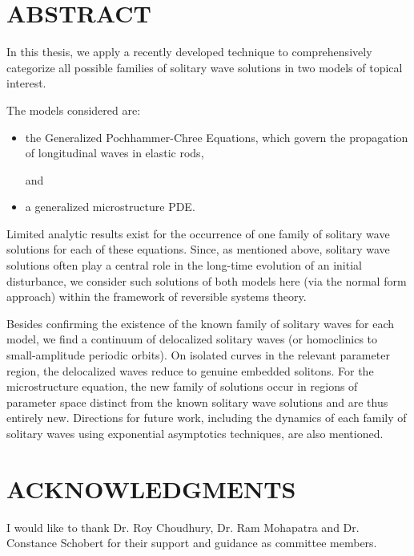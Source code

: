 \chapter*{ABSTRACT}

\indent 

In this thesis, we apply a recently developed technique to
comprehensively categorize all possible families of solitary wave
solutions in two models of topical interest.

The models considered are:
\begin{itemize}
\item the Generalized Pochhammer-Chree Equations, which  govern the propagation of longitudinal waves in elastic rods,

and

\item a generalized microstructure PDE.
\end{itemize}

Limited analytic results exist for the occurrence of one family of  solitary
wave solutions for each of these equations. Since, as mentioned above, solitary
wave solutions often play a central role in the long-time evolution of an
initial disturbance, we consider such solutions of both models here (via the
normal form approach) within the framework of reversible systems theory.

Besides confirming the existence of the known family of solitary waves for each
model, we find a continuum of delocalized solitary waves (or homoclinics to
small-amplitude periodic orbits).  On isolated curves in the relevant parameter
region, the delocalized waves reduce to genuine embedded solitons.  For the
microstructure equation, the new family of solutions occur in regions of
parameter space distinct from the known solitary wave solutions and are thus
entirely new. Directions for future work, including the dynamics of each family of
solitary waves using exponential asymptotics techniques, are also mentioned.



\dedication{
Dedicated To My Family
}



\newpage
{}
\chapter*{ACKNOWLEDGMENTS}

I would like to thank Dr. Roy Choudhury, Dr. Ram Mohapatra and Dr. Constance Schobert for their support and guidance as committee members.

\newpage
